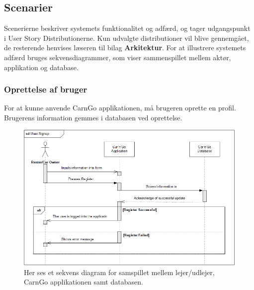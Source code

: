 \documentclass[Rapport/Rapport_main.tex]{subfiles}
\begin{document}
\subsection{Scenarier}
Scenerierne beskriver systemets funktionalitet og adfærd, og tager udgangspunkt i User Story Distributionerne. Kun udvalgte distributioner vil blive gennemgået, de resterende henvises læseren til bilag \textbf{Arkitektur}. 
For at illustrere systemets adfærd bruges sekvensdiagrammer, som viser sammenspillet mellem aktør, applikation og database. 

\subsubsection{Oprettelse af bruger}
For at kunne anvende CarnGo applikationen, må brugeren oprette en profil. Brugerens information gemmes i databasen ved oprettelse. 
\begin{figure}[H]
    \centering
    \includegraphics[width=\textwidth]{Arkitektur/Softwarearkitektur/User_Signup/graphics/UserSignupSD.png}
    \caption{Her ses et sekvens diagram for samspillet mellem lejer/udlejer, CarnGo applikationen samt databasen.}
    \label{fig:UserSignUpSD}
\end{figure}
\end{document}
